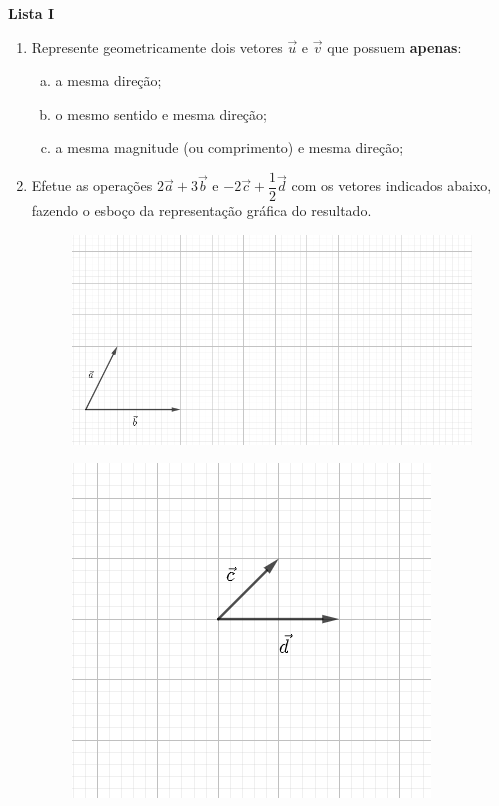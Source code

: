 \documentclass[12pt,a4paper]{article}
\begin{document}
\begin{center}
  \textbf{Lista I}
\end{center}

\begin{enumerate}

  \item Represente geometricamente dois vetores $\vec{u}$ e $\vec{v}$ que possuem
  \textbf{apenas}:
  
    \begin{enumerate}[(a)]
      \item a mesma direção;
      \item o mesmo sentido e mesma direção;
      \item a mesma magnitude (ou comprimento) e mesma direção;
    \end{enumerate}
  
  \item Efetue as operações $2\vec{a} + 3\vec{b}$ e $-2\vec{c} + \dfrac{1}{2}\vec{d}$
  com os vetores indicados abaixo, fazendo o esboço da representação gráfica do resultado.

  \begin{figure}[!htb]
    \centering
    \includegraphics[scale=0.5]{imagem/lista-i-questao-1-a}
  \end{figure}

  \begin{figure}[!htb]
    \centering
    \includegraphics[scale=0.5]{imagem/lista-i-questao-1-b}
  \end{figure}


\end{enumerate}
\end{document}
